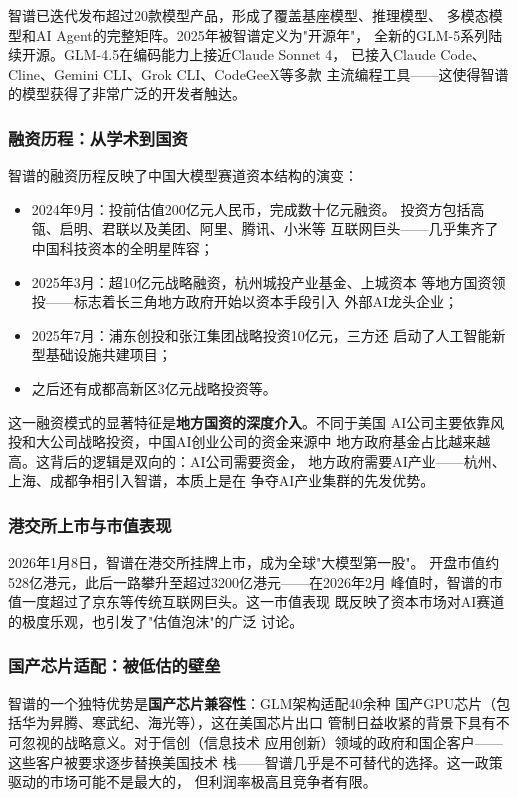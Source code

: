 智谱已迭代发布超过20款模型产品，形成了覆盖基座模型、推理模型、
多模态模型和AI Agent的完整矩阵。2025年被智谱定义为"开源年"，
全新的GLM-5系列陆续开源。GLM-4.5在编码能力上接近Claude Sonnet 4，
已接入Claude Code、Cline、Gemini CLI、Grok CLI、CodeGeeX等多款
主流编程工具——这使得智谱的模型获得了非常广泛的开发者触达。

\subsubsection{融资历程：从学术到国资}
智谱的融资历程反映了中国大模型赛道资本结构的演变：
\begin{itemize}
  \item 2024年9月：投前估值200亿元人民币，完成数十亿元融资。
    投资方包括高瓴、启明、君联以及美团、阿里、腾讯、小米等
    互联网巨头——几乎集齐了中国科技资本的全明星阵容；
  \item 2025年3月：超10亿元战略融资，杭州城投产业基金、上城资本
    等地方国资领投——标志着长三角地方政府开始以资本手段引入
    外部AI龙头企业；
  \item 2025年7月：浦东创投和张江集团战略投资10亿元，三方还
    启动了人工智能新型基础设施共建项目；
  \item 之后还有成都高新区3亿元战略投资等。
\end{itemize}

这一融资模式的显著特征是\textbf{地方国资的深度介入}。不同于美国
AI公司主要依靠风投和大公司战略投资，中国AI创业公司的资金来源中
地方政府基金占比越来越高。这背后的逻辑是双向的：AI公司需要资金，
地方政府需要AI产业——杭州、上海、成都争相引入智谱，本质上是在
争夺AI产业集群的先发优势。

\subsubsection{港交所上市与市值表现}
2026年1月8日，智谱在港交所挂牌上市，成为全球"大模型第一股"。
开盘市值约528亿港元，此后一路攀升至超过3200亿港元——在2026年2月
峰值时，智谱的市值一度超过了京东等传统互联网巨头。这一市值表现
既反映了资本市场对AI赛道的极度乐观，也引发了"估值泡沫"的广泛
讨论。

\subsubsection{国产芯片适配：被低估的壁垒}
智谱的一个独特优势是\textbf{国产芯片兼容性}：GLM架构适配40余种
国产GPU芯片（包括华为昇腾、寒武纪、海光等），这在美国芯片出口
管制日益收紧的背景下具有不可忽视的战略意义。对于信创（信息技术
应用创新）领域的政府和国企客户——这些客户被要求逐步替换美国技术
栈——智谱几乎是不可替代的选择。这一政策驱动的市场可能不是最大的，
但利润率极高且竞争者有限。

